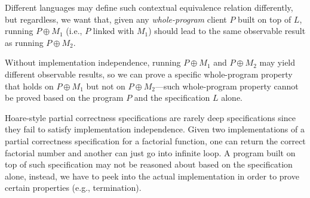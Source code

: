 \begin{center}
\vspace*{-.2ex}
\vspace*{-.2ex}
\end{center}%

\noindent{}Different languages may define such contextual equivalence relation
differently, but regardless, we want that, given any {\em
  whole-program} client $P$ built on top of $L$, running
$P\oplus{}M_1$ (i.e., $P$ linked with $M_1$) should lead to the same
observable result as running $P\oplus{}M_2$.

Without implementation independence, running $P\oplus{}M_1$ and
$P\oplus{}M_2$ may yield different observable results, so we can prove
a specific whole-program property that holds on $P\oplus{}M_1$ but not on
$P\oplus{}M_2$---such whole-program property cannot be proved based
on the program $P$ and the specification $L$ alone. 

Hoare-style partial correctness specifications are rarely
deep specifications since they fail to satisfy implementation
independence. Given two implementations of a partial correctness
specification for a factorial function, one can return the correct
factorial number and another can just go into infinite loop.  A
program built on top of such specification may not be reasoned about 
based on the specification alone, instead, we have to peek into the actual
implementation in order to prove certain properties (e.g.,
termination).

